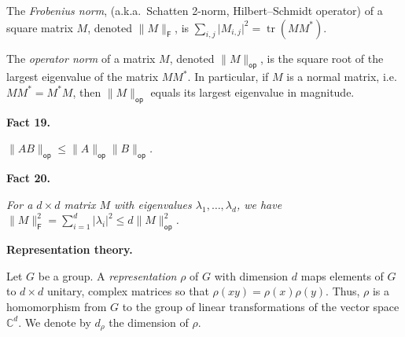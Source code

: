 \documentclass[10pt,a4paper]{article}
\begin{document}
The \emph{Frobenius norm}, (a.k.a. Schatten 2-norm, Hilbert–Schmidt operator) of a square matrix $M$, denoted $\lVert M\rVert_{\mathsf{F}}$, is $\sum_{i,j}\lvert M_{i,j}\rvert^{2}=\operatorname{tr}(MM^{*})$.\par




The \emph{operator norm} of a matrix $M$, denoted $\lVert M\rVert_{\mathsf{op}}$, is the square root of the largest eigenvalue of the matrix $MM^{\ast}$.
In particular, if $M$ is a normal matrix, i.e. $MM^{\ast}=M^{\ast}M$, then $\lVert M\rVert_{\mathsf{op}}$ equals its largest eigenvalue in magnitude.\par





\par\medskip\noindent\textbf{
\textbf{Fact 19}\textbf{.}
}\par



$\lVert AB\rVert_{\mathsf{op}}\leq\lVert A\rVert_{\mathsf{op}}\lVert B\rVert_{\mathsf{op}}$\emph{.}\par







\par\medskip\noindent\textbf{
\textbf{Fact 20}\textbf{.}
}\par



\emph{For a $d\times d$ matrix $M$ with eigenvalues $\lambda_{1},\ldots,\lambda_{d}$, we have $\lVert M\rVert_{\mathsf{F}}^{2}=\sum_{i=1}^{d}\lvert\lambda_{i}\rvert^{2}\leq d\lVert M\rVert_{\mathsf{op}}^{2}$.}\par







\par\medskip\noindent\textbf{Representation theory.}\par




Let $G$ be a group. A \emph{representation }$\rho$ of $G$ with
dimension $d$ maps elements of $G$ to $d\times d$ unitary, complex
matrices so that $\rho(xy)=\rho(x)\rho(y)$. Thus, $\rho$ is a homomorphism
from $G$ to the group of linear transformations of the vector space
$\mathbb{C}^{d}$. We denote by $d_{\rho}$ the dimension of $\rho$.\par
\end{document}
